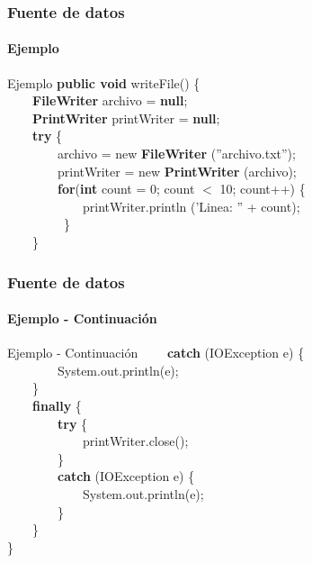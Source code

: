 \documentclass{beamer}
\begin{document}
		\begin{frame}
			\frametitle{Fuente de datos}
			\framesubtitle{Ejemplo}

			\begin{block}{Ejemplo}
			{\scriptsize
				\textbf{public void} writeFile() \{ \\
				\ \ \ \ \textbf{FileWriter} archivo = \textbf{null}; \\ 
			         \ \ \ \ \textbf{PrintWriter} printWriter = \textbf{null};\\
				\ \ \ \ \textbf{try} \{ \\
                       		\ \ \ \ \ \ \ \ archivo = new \textbf{FileWriter} (''archivo.txt''); \\
				\ \ \ \ \ \ \ \ printWriter = new \textbf{PrintWriter} (archivo); \\
				\ \ \ \ \ \ \ \ \textbf{for}(\textbf{int} count = 0; count $<$ 10; count++) \{ \\
				\ \ \ \ \ \ \ \ \ \ \ \ printWriter.println ('Linea: '' + count); \\
				\ \ \ \ \ \ \ \ \ \} \\
				\ \ \ \ \} \\
			}
			\end{block}
		\end{frame}

		\begin{frame}
			\frametitle{Fuente de datos}
			\framesubtitle{Ejemplo - Continuaci\'on}

			\begin{block}{Ejemplo  - Continuaci\'on}
			{\scriptsize
				\ \ \ \ \textbf{catch} (IOException e) \{ \\
                                     \ \ \ \ \ \ \ \ System.out.println(e); \\
                                     \ \ \ \ \} \\
                                     \ \ \ \ \textbf{finally} \{ \\
                                     \ \ \ \ \ \ \ \ \textbf{try} \{ \\
                                     \ \ \ \ \ \ \ \ \ \ \ \ printWriter.close(); \\
                                     \ \ \ \ \ \ \ \ \} \\
                                     \ \ \ \ \ \ \ \ \textbf{catch} (IOException e) \{ \\
                                     \ \ \ \ \ \ \ \ \ \ \ \ System.out.println(e); \\
                                     \ \ \ \ \ \ \ \ \}\\
                                     \ \ \ \ \} \\
                                     \}
			}
			\end{block}
		\end{frame}
    
\end{document}
